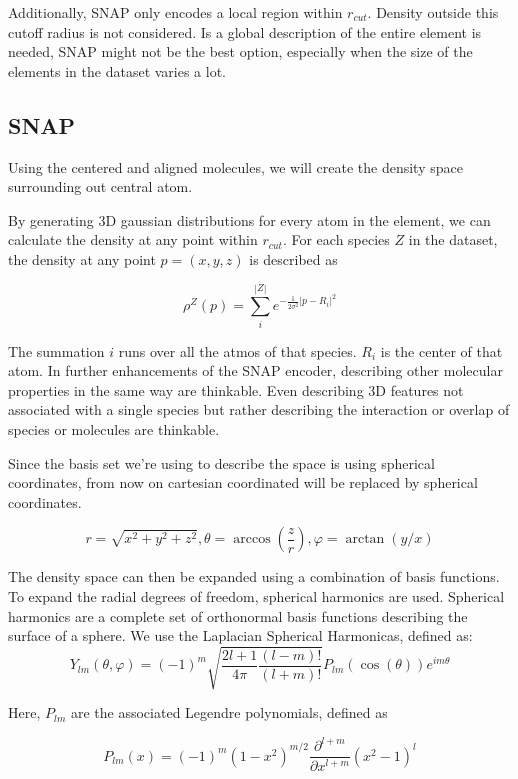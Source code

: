 Additionally, SNAP only encodes a local region within $r_{cut}$.
Density outside this cutoff radius is not considered.
Is a global description of the entire element is needed, SNAP might not be the best option, especially when 
the size of the elements in the dataset varies a lot.


\subsection{SNAP}

Using the centered and aligned molecules, we will create the density space surrounding out central atom.

By generating 3D gaussian distributions for every atom in the element, we can calculate the density at any point within $r_{cut}$.
For each species $Z$ in the dataset, the density at any point $p = (x,y,z)$ is described as

$$\rho^Z(p) = \sum_i^{|Z|} e^{- \frac{1}{2\sigma^2} \vert p - R_i \vert^2 }$$ 

The summation $i$ runs over all the atmos of that species. $R_i$ is the center of that atom.
In further enhancements of the SNAP encoder, describing other molecular properties in the same way are thinkable.
Even describing 3D features not associated with a single species but rather describing the interaction or overlap of species 
or molecules are thinkable.

Since the basis set we're using to describe the space is using spherical coordinates, from now on
cartesian coordinated will be replaced by spherical coordinates.

$$
r = \sqrt{x^2 + y^2 + z^2}
,
\theta = \arccos(\frac{z}{r})
,
\varphi = \arctan(y / x)
$$

The density space can then be expanded using a combination of basis functions.
To expand the radial degrees of freedom, spherical harmonics are used.
Spherical harmonics are a complete set of orthonormal basis functions describing the surface of a sphere.
We use the Laplacian Spherical Harmonicas, defined as:
$$
Y_{lm}(\theta, \varphi) = (-1)^m \sqrt{\frac{2l + 1}{4 \pi} \frac{(l - m)!}{(l + m)!}} P_{lm}\left(\cos(\theta) \right) e^{im\theta}
$$



Here, $P_{lm}$ are the associated Legendre polynomials, defined as

$$
P_{lm}(x) = (-1)^m (1-x^2)^{m/2} \frac{\partial^{l+m}}{\partial x^{l+m}}(x^2 - 1)^l
$$ %



